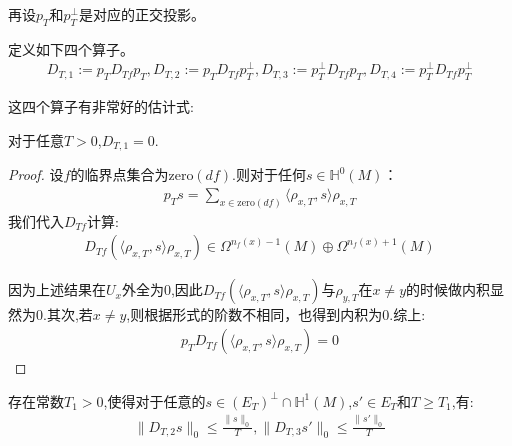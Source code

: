 再设$p_T$和$p_T^{\perp}$是对应的正交投影。

\begin{definition}[Witten形变算子]
	定义如下四个算子。
	\begin{align}
		D_{T,1}:=p_T D_{Tf}p_T,D_{T,2}:=p_T D_{Tf} p_T^{\perp},D_{T,3}:=p_T^{\perp} D_{Tf}p_T,D_{T,4}:=p_T^{\perp} D_{Tf}p_T^{\perp}
	\end{align}
	
\end{definition}

这四个算子有非常好的估计式:
\begin{proposition}
	对于任意$T>0$,$D_{T,1}=0$.
\end{proposition}
\begin{proof}
	设$f$的临界点集合为$\mathrm{zero}(df)$.则对于任何$s \in \mathbb{H}^0(M)$：
	\begin{align*}
		p_T s=\sum_{x \in \mathrm{zero}(df)}\langle \rho_{x,T},s\rangle\rho_{x,T}
	\end{align*}
	我们代入$D_{Tf}$计算:
	\begin{align}
		D_{Tf}(\langle \rho_{x,T},s\rangle\rho_{x,T}) \in \Omega^{n_f(x)-1}(M)\oplus \Omega^{n_f(x)+1}(M)
	\end{align}

	因为上述结果在$U_x$外全为$0$,因此$D_{Tf}(\langle \rho_{x,T},s\rangle\rho_{x,T})$与$\rho_{y,T}$在$x\neq y$的时候做内积显然为$0$.其次,若$x \neq y$,则根据形式的阶数不相同，也得到内积为$0$.综上:
	\begin{align}
		p_T D_{Tf}(\langle \rho_{x,T},s\rangle\rho_{x,T})=0
	\end{align}
\end{proof}
\begin{proposition}
	存在常数$T_1>0$,使得对于任意的$s \in (E_T)^{\perp} \cap \mathbb{H}^1(M)$,$s' \in E_T$和$T \geq T_1$,有:
	\begin{align}
		\|D_{T,2}s\|_0\leq 
	\frac{\|s\|_0}{T},\|D_{T,3}s'\|_0\leq \frac{\|s'\|_0}{T}
	\end{align}
\end{proposition}
